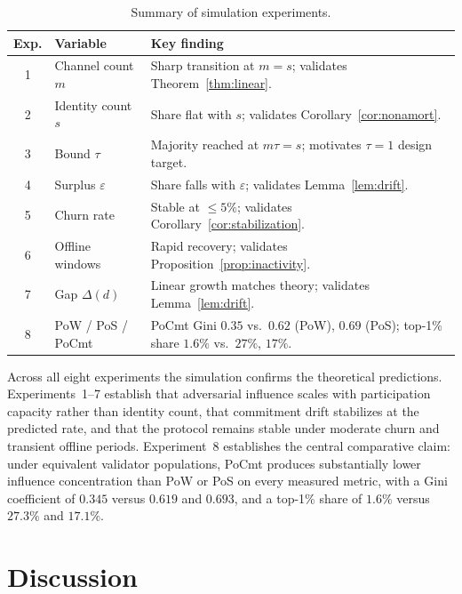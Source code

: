\documentclass[10pt,journal,twoside]{IEEEtran}
\theoremstyle{remark}
\begin{document}
	\begin{table}[t]
		\centering
		\caption{Summary of simulation experiments.}
		\label{tab:eval}
		\renewcommand{\arraystretch}{1.15}
		\begin{tabular}{@{}clp{3.2cm}@{}}
			\toprule
			\textbf{Exp.} & \textbf{Variable} & \textbf{Key finding} \\
			\midrule
			1 & Channel count $m$
			& Sharp transition at $m = s$;
			validates Theorem~\ref{thm:linear}. \\
			2 & Identity count $s$
			& Share flat with $s$;
			validates Corollary~\ref{cor:nonamort}. \\
			3 & Bound $\tau$
			& Majority reached at $m\tau = s$;
			motivates $\tau = 1$ design target. \\
			4 & Surplus $\varepsilon$
			& Share falls with $\varepsilon$;
			validates Lemma~\ref{lem:drift}. \\
			5 & Churn rate
			& Stable at $\leq 5\%$;
			validates Corollary~\ref{cor:stabilization}. \\
			6 & Offline windows
			& Rapid recovery;
			validates Proposition~\ref{prop:inactivity}. \\
			7 & Gap $\Delta(d)$
			& Linear growth matches theory;
			validates Lemma~\ref{lem:drift}. \\
			8 & PoW / PoS / PoCmt
			& PoCmt Gini $0.35$ vs.\
			$0.62$ (PoW), $0.69$ (PoS);
			top-1\% share $1.6\%$ vs.\
			$27\%$, $17\%$. \\
			\bottomrule
		\end{tabular}
	\end{table}
	
	Across all eight experiments the simulation confirms the
	theoretical predictions.
	Experiments~1--7 establish that adversarial influence
	scales with participation capacity rather than identity
	count, that commitment drift stabilizes at the predicted
	rate, and that the protocol remains stable under moderate
	churn and transient offline periods.
	Experiment~8 establishes the central comparative claim:
	under equivalent validator populations, PoCmt produces
	substantially lower influence concentration than PoW
	or PoS on every measured metric, with a Gini coefficient
	of $0.345$ versus $0.619$ and $0.693$, and a top-1\%
	share of $1.6\%$ versus $27.3\%$ and $17.1\%$.
	\section{Discussion}
	\label{sec:discussion}
	
\end{document}
